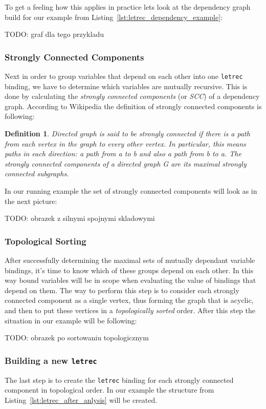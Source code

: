 \documentclass[12pt,a4paper]{report}
\newtheorem{definition}{Definition}[chapter]
\begin{document}
To get a feeling how this applies in practice lets look at the dependency graph
build for our example from Listing~\ref{lst:letrec_dependency_example}:

TODO: graf dla tego przykladu

\subsubsection{Strongly Connected Components}
Next in order to group variables that depend on each other into one
\texttt{letrec} binding, we have to determine which variables are mutually
recursive. This is done by calculating the \textit{strongly connected
components} (or \textit{SCC}) of a dependency graph. According to Wikipedia the
definition of strongly connected components is following:

\begin{definition}
Directed graph is said to be strongly connected if there is a path from each
vertex in the graph to every other vertex. In particular, this means paths in
each direction: a path from a to b and also a path from b to a.
The strongly connected components of a directed graph G are its maximal
strongly connected subgraphs.
\end{definition}

In our running example the set of strongly connected components will look as
in the next picture:

TODO: obrazek z silnymi spojnymi skladowymi

\subsubsection{Topological Sorting}
After successfully determining the maximal sets of mutually dependant variable
bindings, it's time to know which of these groups depend on each other. In this
way bound variables will be in scope when evaluating the value of bindings that
depend on them. The way to perform this step is to consider each strongly
connected component as a single vertex, thus forming the graph that is acyclic,
and then to put these vertices in a \textit{topologically sorted} order. After
this step the situation in our example will be following:

TODO: obrazek po sortowaniu topologicznym


\subsubsection{Building a new \texttt{letrec}}
The last step is to create the \texttt{letrec} binding for each strongly
connected component in topological order. In our example the structure from
Listing~\ref{lst:letrec_after_anlysis} will be created.
\end{document}
